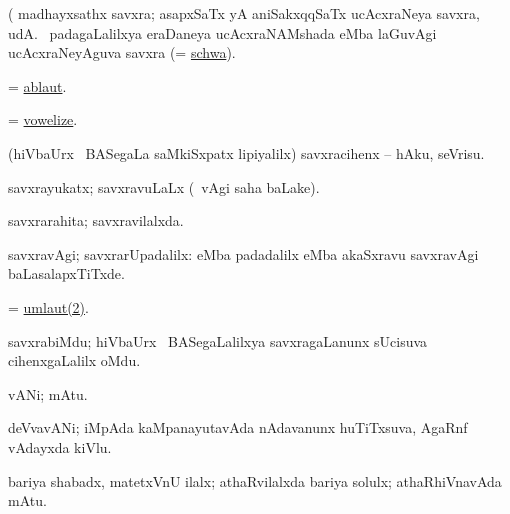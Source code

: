 \noindent 
\gl{\pagu}
\expl{}
\bmng
  (    madhayxsathx savxra; asapxSaTx yA aniSakxqqSaTx ucAcxraNeya savxra, udA.  \mo\ padagaLalilxya eraDaneya ucAcxraNAMshada  eMba laGuvAgi ucAcxraNeyAguva savxra (= \hyperref{kandict_s.pdf}{S}{schwa}{schwa}). 
\emng
\eentry

\bentry
{}
\gl{\nA}
\expl{}
\bmng
 = \hyperref{kandict_a.pdf}{A}{ablaut}{ablaut}. 
\emng
\eentry

\bentry
{} 
\gl{\sakirx}
\expl{}
\bmng
 = \hyperlink{vowelize}{vowelize}. 
\emng
\eentry

\bentry
{} 
\gl{\sakirx}
\expl{}
\bmng
 (hiVbaUrx \mo\ BASegaLa saMkiSxpatx lipiyalilx) savxracihenx -- hAku, seVrisu. 
\emng
\eentry

\bentry
{} 
\gl{\gu}
\expl{}
\bmng
 savxrayukatx; savxravuLaLx (\saMpa\ vAgi saha baLake). 
\emng
\eentry

\bentry
{} 
\gl{\gu}
\expl{}
\bmng
 savxrarahita; savxravilalxda. 
\emng
\eentry

\bentry 
{} 
\gl{\kirxvi}
\expl{}
\bmng
 savxravAgi; savxrarUpadalilx:  eMba padadalilx  eMba akaSxravu savxravAgi baLasalapxTiTxde. 
\emng
\eentry

\bentry
{}
\gl{\nA}
\expl{}
\bmng
 = \hyperref{kandict_u.pdf}{U}{umlaut(2)}{umlaut(2)}. 
\emng
\eentry

\bentry
{} 
\pron{}
\gl{\nA}
\expl{}
\bmng
 savxrabiMdu; hiVbaUrx \mo\ BASegaLalilxya savxragaLanunx sUcisuva cihenxgaLalilx oMdu. 
\emng
\eentry

\bentry 
{} 
\gl{\nA}
\expl{}
\bmng
 vANi; mAtu. 
\emng
\eentry

\bentry 
{} 
\gl{\nA}
\expl{\Latin}
\bmng
deVvavANi; iMpAda kaMpanayutavAda nAdavanunx huTiTxsuva, AgaRnf vAdayxda kiVlu. 
\emng
\eentry

\bentry 
{} 
\gl{\nA}
\expl{\Latin }
\bmng
bariya shabadx, matetxVnU ilalx; athaRvilalxda bariya solulx; athaRhiVnavAda mAtu. 
\emng
\eentry

